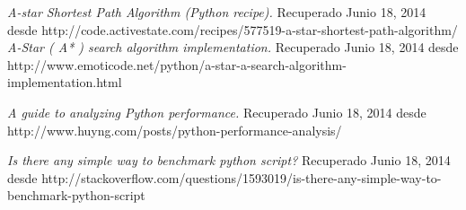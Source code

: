 \documentclass[letter, titlepage, 10pt]{article}
\begin{document}
\begin{thebibliography}{10}
     {\em A-star Shortest Path Algorithm (Python recipe).} Recuperado Junio 18, 2014 desde http://code.activestate.com/recipes/577519-a-star-shortest-path-algorithm/
     {\em A-Star ( A* ) search algorithm implementation.} Recuperado Junio 18, 2014 desde http://www.emoticode.net/python/a-star-a-search-algorithm-implementation.html

     {\em A guide to analyzing Python performance.} Recuperado Junio 18, 2014 desde http://www.huyng.com/posts/python-performance-analysis/
    
     {\em Is there any simple way to benchmark python script?} Recuperado Junio 18, 2014 desde http://stackoverflow.com/questions/1593019/is-there-any-simple-way-to-benchmark-python-script


\end{thebibliography}
\end{document}
